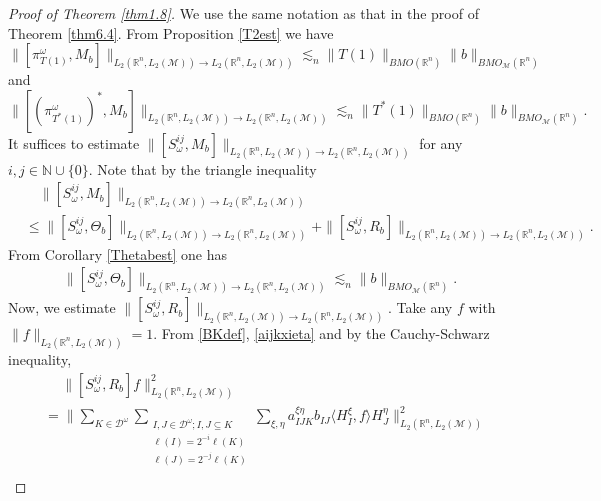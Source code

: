\documentclass[oneside,english,a4wide]{amsart}
\numberwithin{equation}{section}
\numberwithin{figure}{section}
\theoremstyle{plain}
\theoremstyle{plain}
\theoremstyle{definition}
\theoremstyle{plain}
\theoremstyle{remark}
\theoremstyle{definition}
\theoremstyle{remark}
\theoremstyle{definition}
\newcommand{\8}{\infty}
\begin{document}
\begin{proof}[Proof of Theorem \ref{thm1.8}]
	We use the same notation as that in the proof of Theorem \ref{thm6.4}. From  Proposition \ref{T2est} we have
	\begin{equation*}
		\|[\pi_{T(1)}^{\omega}, M_b]\|_{L_2(\mathbb{R}^n,L_2(\mathcal{M}))\to L_2(\mathbb{R}^n,L_2(\mathcal{M}))}\lesssim_{n}\|T(1)\|_{BMO(\mathbb{R}^n)} \|b\|_{BMO_{\mathcal{M}}(\mathbb{R}^n)}
	\end{equation*}
	and
	\begin{equation*}
		\|[(\pi_{T^*(1)}^{\omega})^*, M_b]\|_{L_2(\mathbb{R}^n,L_2(\mathcal{M}))\to L_2(\mathbb{R}^n,L_2(\mathcal{M}))}\lesssim_{n}\|T^*(1)\|_{BMO(\mathbb{R}^n)} \|b\|_{BMO_{\mathcal{M}}(\mathbb{R}^n)}.
	\end{equation*}
	It suffices to estimate $\|[S_\omega^{ij}, M_b]\|_{L_2(\mathbb{R}^n,L_2(\mathcal{M}))\to L_2(\mathbb{R}^n,L_2(\mathcal{M}))}$ for any $i, j\in \mathbb{N}\cup\{0\}$.
	Note that by the triangle inequality
	\begin{equation}\label{thm1.88}
		\begin{aligned}
			{}&\quad\|[S_\omega^{ij},M_b]\|_{L_2(\mathbb{R}^n,L_2(\mathcal{M}))\to L_2(\mathbb{R}^n,L_2(\mathcal{M}))}\\&\le \|[S_\omega^{ij},\Theta_b]\|_{L_2(\mathbb{R}^n,L_2(\mathcal{M}))\to L_2(\mathbb{R}^n,L_2(\mathcal{M}))}+\|[S_\omega^{ij},R_b]\|_{L_2(\mathbb{R}^n,L_2(\mathcal{M}))\to L_2(\mathbb{R}^n,L_2(\mathcal{M}))}.
		\end{aligned}
	\end{equation}
	From Corollary \ref{Thetabest} one has
	\begin{equation*}
		\begin{aligned}
			\|[S_\omega^{ij},\Theta_b]\|_{L_2(\mathbb{R}^n,L_2(\mathcal{M}))\to L_2(\mathbb{R}^n,L_2(\mathcal{M}))}\lesssim_{n} \|b\|_{BMO_\mathcal{M}(\mathbb{R}^n)}.
		\end{aligned}
	\end{equation*}
	Now, we estimate $\|[S_\omega^{ij},R_b]\|_{L_2(\mathbb{R}^n,L_2(\mathcal{M}))\to L_2(\mathbb{R}^n,L_2(\mathcal{M}))}$. Take any $f$ with $\|f\|_{L_2(\mathbb{R}^n,L_2(\mathcal{M}))}=1$. From \eqref{BKdef}, \eqref{aijkxieta} and by the Cauchy-Schwarz inequality,
	\begin{equation}\label{form}
		\begin{aligned}
			{}&\quad\ \|[S_\omega^{ij},R_b]f\|^2_{L_2(\mathbb{R}^n,L_2(\mathcal{M}))}\\
			&=\biggl\|\sum_{K\in\mathcal{D}^\omega}\sum_{\substack{I,J\in\mathcal{D}^\omega;I,J\subseteq K\\ \ell(I)=2^{-i}\ell(K)\\\ell(J)=2^{-j}\ell(K)}}\sum_{\xi,\eta}a_{IJK}^{\xi\eta}b_{IJ}\langle H^\xi_I,f\rangle H^\eta_J\biggr\|^2_{L_2(\mathbb{R}^n,L_2(\mathcal{M}))}\\

\end{aligned}
\end{equation}
\end{proof}
\end{document}
